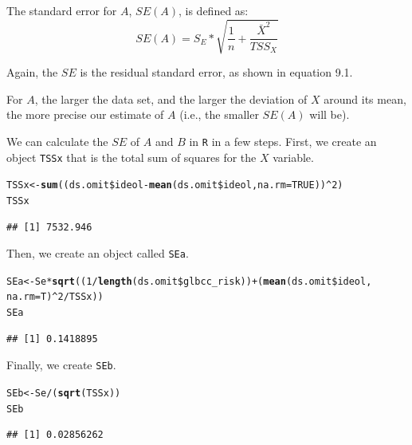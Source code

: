 \documentclass[11pt,openany]{book}\usepackage[]{graphicx}\usepackage[]{color}
\makeatletter
\newcommand{\hlnum}[1]{\textcolor[rgb]{0.686,0.059,0.569}{#1}}%
\newcommand{\hlopt}[1]{\textcolor[rgb]{0,0,0}{#1}}%
\newcommand{\hlstd}[1]{\textcolor[rgb]{0.345,0.345,0.345}{#1}}%
\newcommand{\hlkwb}[1]{\textcolor[rgb]{0.69,0.353,0.396}{#1}}%
\newcommand{\hlkwc}[1]{\textcolor[rgb]{0.333,0.667,0.333}{#1}}%
\newcommand{\hlkwd}[1]{\textcolor[rgb]{0.737,0.353,0.396}{\textbf{#1}}}%
\newenvironment{kframe}{%
 \def\at@end@of@kframe{}%
 \ifinner\ifhmode%
  \def\at@end@of@kframe{\end{minipage}}%
  \begin{minipage}{\columnwidth}%
 \fi\fi%
 \def\FrameCommand##1{\hskip\@totalleftmargin \hskip-\fboxsep
 \colorbox{shadecolor}{##1}\hskip-\fboxsep
     \hskip-\linewidth \hskip-\@totalleftmargin \hskip\columnwidth}%
 \MakeFramed {\advance\hsize-\width
   \@totalleftmargin\z@ \linewidth\hsize
   \@setminipage}}%
 {\par\unskip\endMakeFramed%
 \at@end@of@kframe}
\newenvironment{knitrout}{}{} %
\renewenvironment{knitrout}{\begin{singlespace}}{\end{singlespace}}
\makeatother
\begin{document}
The standard error for $A$, $SE(A)$, is defined as:
\begin{equation}
SE(A)=S_{E}*\sqrt{\frac{1}{n}+\frac{\bar X^{2}}{TSS_{X}}}
\end{equation}

Again, the $SE$ is the residual standard error, as shown in equation 9.1.

\noindent For $A$, the larger the data set, and the larger the deviation of $X$ around its mean, the more precise our estimate of $A$ (i.e., the smaller $SE(A)$ will be).  

We can calculate the $SE$ of $A$ and $B$ in \texttt{R} in a few steps. First, we create an object \texttt{TSSx} that is the total sum of squares for the $X$ variable. 

\begin{knitrout}
\color{fgcolor}\begin{kframe}
\begin{alltt}
\hlstd{TSSx} \hlkwb{<-} \hlkwd{sum}\hlstd{((ds.omit}\hlopt{\$}\hlstd{ideol} \hlopt{-} \hlkwd{mean}\hlstd{(ds.omit}\hlopt{\$}\hlstd{ideol,} \hlkwc{na.rm} \hlstd{=} \hlnum{TRUE}\hlstd{))}\hlopt{^}\hlnum{2}\hlstd{)}
\hlstd{TSSx}
\end{alltt}
\begin{verbatim}
## [1] 7532.946
\end{verbatim}
\end{kframe}
\end{knitrout}

\noindent Then, we create an object called \texttt{SEa}.
\begin{knitrout}
\color{fgcolor}\begin{kframe}
\begin{alltt}
\hlstd{SEa} \hlkwb{<-} \hlstd{Se} \hlopt{*} \hlkwd{sqrt}\hlstd{((}\hlnum{1}\hlopt{/}\hlkwd{length}\hlstd{(ds.omit}\hlopt{\$}\hlstd{glbcc_risk))} \hlopt{+} \hlstd{(}\hlkwd{mean}\hlstd{(ds.omit}\hlopt{\$}\hlstd{ideol,}
    \hlkwc{na.rm} \hlstd{= T)}\hlopt{^}\hlnum{2}\hlopt{/}\hlstd{TSSx))}
\hlstd{SEa}
\end{alltt}
\begin{verbatim}
## [1] 0.1418895
\end{verbatim}
\end{kframe}
\end{knitrout}

\noindent Finally, we create  \texttt{SEb}.
\begin{knitrout}
\color{fgcolor}\begin{kframe}
\begin{alltt}
\hlstd{SEb} \hlkwb{<-} \hlstd{Se}\hlopt{/}\hlstd{(}\hlkwd{sqrt}\hlstd{(TSSx))}
\hlstd{SEb}
\end{alltt}
\begin{verbatim}
## [1] 0.02856262
\end{verbatim}
\end{kframe}
\end{knitrout}
\end{document}
